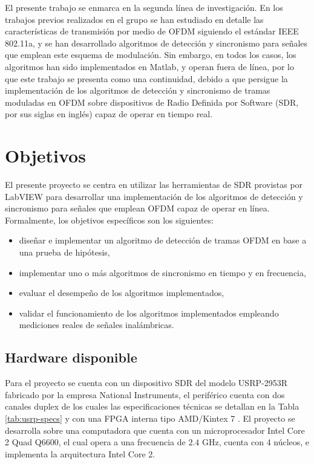 El presente trabajo se enmarca en la segunda línea de investigación. En los trabajos previos realizados en el grupo se han estudiado en detalle las características de transmisión por medio de OFDM siguiendo el estándar IEEE 802.11a, y se han desarrollado algoritmos de detección y sincronismo para señales que emplean este esquema de modulación. Sin embargo, en todos los casos, los algoritmos han sido implementados en Matlab, y operan fuera de línea, por lo que este trabajo se presenta como una continuidad, debido a que persigue la implementación de los algoritmos de detección y sincronismo de tramas moduladas en OFDM sobre dispositivos de Radio Definida por Software (SDR, por sus siglas en inglés) capaz de operar en tiempo real.

\section{Objetivos}
\label{S:ch1-objetivos}

El presente proyecto se centra en utilizar las herramientas de SDR provistas por LabVIEW para desarrollar una implementación de los algoritmos de detección y sincronismo para señales que emplean OFDM capaz de operar en línea. Formalmente, los objetivos específicos son los siguientes:
\begin{itemize}
    \item diseñar e implementar un algoritmo de detección de tramas OFDM en base a una prueba de hipótesis,
    \item implementar uno o más algoritmos de sincronismo en tiempo y en frecuencia,
    \item evaluar el desempeño de los algoritmos implementados, 
    \item validar el funcionamiento de los algoritmos implementados empleando mediciones reales de señales inalámbricas.
\end{itemize}

\color{RoyalBlue}
\subsection{Hardware disponible}
Para el proyecto se cuenta con un dispositivo SDR del modelo USRP-2953R fabricado por la empresa National Instruments, el periférico cuenta con dos canales duplex de los cuales las especificaciones técnicas se detallan en la Tabla \ref{tab:usrp-specs} y con una FPGA interna tipo AMD/Kintex 7 \cite{usrp2953}. El proyecto se desarrolla sobre una computadora que cuenta con un microprocesador Intel Core 2 Quad Q6600, el cual opera a una frecuencia de $2.4$ GHz, cuenta con 4 núcleos, e implementa la arquitectura Intel Core 2.

